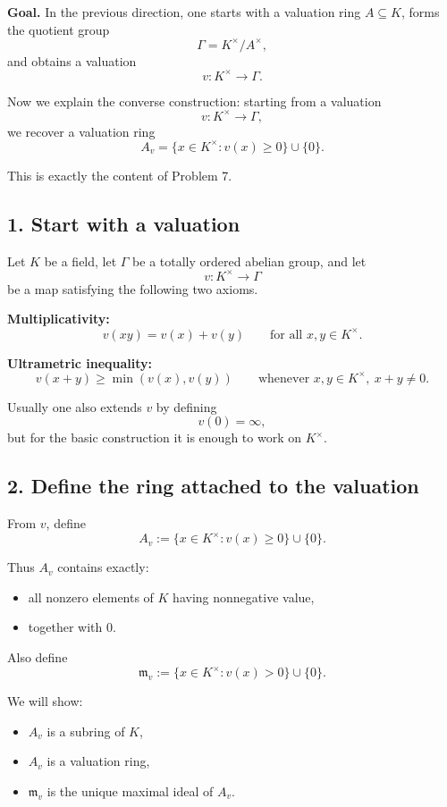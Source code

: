 \documentclass[12pt,a4paper]{article}
\theoremstyle{notespace}
\begin{document}
\textbf{Goal.}
In the previous direction, one starts with a valuation ring \(A\subseteq K\), forms the quotient group
\[
\Gamma=K^\times/A^\times,
\]
and obtains a valuation
\[
v:K^\times\to \Gamma.
\]

Now we explain the converse construction: starting from a valuation
\[
v:K^\times\to \Gamma,
\]
we recover a valuation ring
\[
A_v=\{x\in K^\times : v(x)\ge 0\}\cup\{0\}.
\]

This is exactly the content of Problem 7.

\subsection{1. Start with a valuation}

Let \(K\) be a field, let \(\Gamma\) be a totally ordered abelian group, and let
\[
v:K^\times\to \Gamma
\]
be a map satisfying the following two axioms.

\textbf{Multiplicativity:}
\[
v(xy)=v(x)+v(y)
\qquad
\text{for all }x,y\in K^\times.
\]

\textbf{Ultrametric inequality:}
\[
v(x+y)\ge \min(v(x),v(y))
\qquad
\text{whenever }x,y\in K^\times,\ x+y\neq 0.
\]

Usually one also extends \(v\) by defining
\[
v(0)=\infty,
\]
but for the basic construction it is enough to work on \(K^\times\).

\subsection{2. Define the ring attached to the valuation}

From \(v\), define
\[
A_v:=\{x\in K^\times : v(x)\ge 0\}\cup\{0\}.
\]

Thus \(A_v\) contains exactly:
\begin{itemize}
	\item all nonzero elements of \(K\) having nonnegative value,
	\item together with \(0\).
\end{itemize}

Also define
\[
\mathfrak m_v:=\{x\in K^\times : v(x)>0\}\cup\{0\}.
\]

We will show:
\begin{itemize}
	\item \(A_v\) is a subring of \(K\),
	\item \(A_v\) is a valuation ring,
	\item \(\mathfrak m_v\) is the unique maximal ideal of \(A_v\).
\end{itemize}
\end{document}

